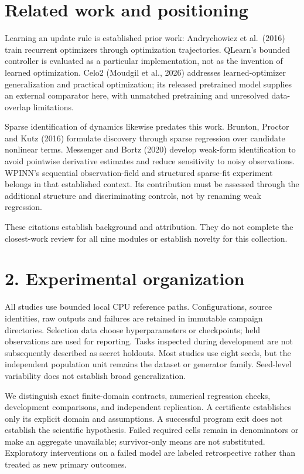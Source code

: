 \documentclass[
]{article}
\begin{document}
\section{Related work and
positioning}\label{related-work-and-positioning}

Learning an update rule is established prior work: Andrychowicz et
al.~(2016) train recurrent optimizers through optimization trajectories.
QLearn's bounded controller is evaluated as a particular implementation,
not as the invention of learned optimization. Celo2 (Moudgil et al.,
2026) addresses learned-optimizer generalization and practical
optimization; its released pretrained model supplies an external
comparator here, with unmatched pretraining and unresolved data-overlap
limitations.

Sparse identification of dynamics likewise predates this work. Brunton,
Proctor and Kutz (2016) formulate discovery through sparse regression
over candidate nonlinear terms. Messenger and Bortz (2020) develop
weak-form identification to avoid pointwise derivative estimates and
reduce sensitivity to noisy observations. WPINN's sequential
observation-field and structured sparse-fit experiment belongs in that
established context. Its contribution must be assessed through the
additional structure and discriminating controls, not by renaming weak
regression.

These citations establish background and attribution. They do not
complete the closest-work review for all nine modules or establish
novelty for this collection.

\section{2. Experimental organization}\label{experimental-organization}

All studies use bounded local CPU reference paths. Configurations,
source identities, raw outputs and failures are retained in immutable
campaign directories. Selection data choose hyperparameters or
checkpoints; held observations are used for reporting. Tasks inspected
during development are not subsequently described as secret holdouts.
Most studies use eight seeds, but the independent population unit
remains the dataset or generator family. Seed-level variability does not
establish broad generalization.

We distinguish exact finite-domain contracts, numerical regression
checks, development comparisons, and independent replication. A
certificate establishes only its explicit domain and assumptions. A
successful program exit does not establish the scientific hypothesis.
Failed required cells remain in denominators or make an aggregate
unavailable; survivor-only means are not substituted. Exploratory
interventions on a failed model are labeled retrospective rather than
treated as new primary outcomes.
\end{document}
